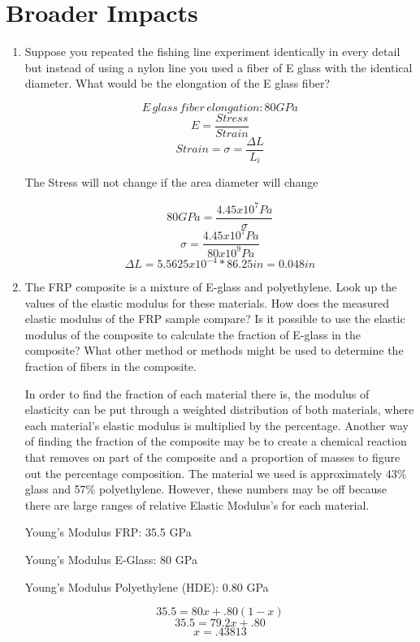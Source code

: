 \documentclass{article}
\begin{document}
\section{Broader Impacts}
\begin{enumerate}
\item Suppose you repeated the fishing line experiment identically in every detail but instead of using a nylon line you used a fiber of E glass with the identical diameter. What would be the elongation of the E glass fiber? \par

$$E \, glass \, fiber \, elongation: 80 GPa$$
$$E = \frac{Stress}{Strain}$$ 
$$Strain = \sigma = \frac{\Delta L}{L_i}$$
\begin{center}
The Stress will not change if the area diameter will change
\end{center}
$$ 80 GPa = \frac{4.45x10^7 Pa}{\sigma}$$
$$ \sigma = \frac{4.45x10^7 Pa}{80x10^9 Pa}$$
$$ \Delta L = 5.5625x10^{-4} * 86.25 in = 0.048 in$$

\item The FRP composite is a mixture of E-glass and polyethylene. Look up the values of the elastic modulus for these materials. How does the measured elastic modulus of the FRP sample compare? Is it possible to use the elastic modulus of the composite to calculate the fraction of E-glass in the composite? What other method or methods might be used to determine the fraction of fibers in the composite. \par

In order to find the fraction of each material there is, the modulus of elasticity can be put through a weighted distribution of both materials, where each material's elastic modulus is multiplied by the percentage. Another way of finding the fraction of the composite may be to create a chemical reaction that removes on part of the composite and a proportion of masses to figure out the percentage composition. The material we used is approximately 43\% glass and 57\% polyethylene. However, these numbers may be off because there are large ranges of relative Elastic Modulus's for each material. 

\begin{center}
Young's Modulus FRP: 35.5 GPa\par Young's Modulus E-Glass: 80 GPa  \par Young's Modulus Polyethylene (HDE): 0.80 GPa \par

$$35.5 = 80x + .80(1-x)$$
$$35.5 = 79.2x + .80$$ 
$$ x = .43813$$

\end{center}

\end{enumerate}
\end{document}
